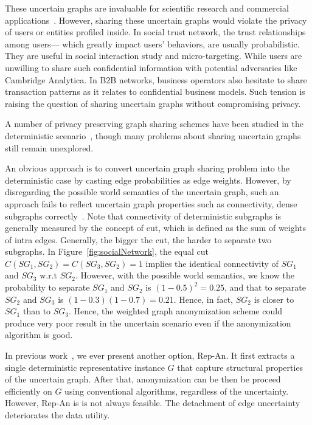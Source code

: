 These uncertain graphs are invaluable for scientific research and commercial applications~\cite{Kempe_Maximizing_2003,Cho_Friendship_2011}. However, sharing these uncertain graphs would violate the privacy of users or entities profiled inside. In social trust network, the trust relationships among users--- which greatly impact users' behaviors, are usually probabilistic.  They are useful in social interaction study and micro-targeting. While users are unwilling to share such confidential information with potential adversaries like Cambridge Analytica. In B2B networks, business operators also hesitate to share transaction patterns as it relates to  confidential business models. Such tension is raising the question of sharing uncertain graphs without compromising privacy. 


A number of privacy preserving graph sharing schemes have been studied in the deterministic scenario~\cite{Liu_Towards_2008,Ying_Randomizing_2008,Wang2011,Liu_Privacy_2009,Nguyen_Anonymizing_2015,Sala_Sharing_2011,Xiao_Differentially_2014,lee2011}, though many problems about sharing uncertain graphs still remain unexplored.

An obvious approach is to convert uncertain graph sharing problem into the deterministic case by casting edge probabilities as edge weights. However, by disregarding the possible world semantics of the uncertain graph, such an approach fails to reflect uncertain graph properties such as connectivity, dense subgraphs correctly~\cite{Zhao_Detecting_2014,Hua_Probabilistic_2010}. {\small Note that connectivity of deterministic subgraphs is generally measured by the concept of cut, which is defined as the sum of weights of intra edges. Generally, the bigger the cut, the harder to separate two subgraphs. In Figure~\ref{fig:socialNetwork}, the equal cut $C(SG_{1},SG_{2})=C(SG_{3},SG_{2})=1$ implies the identical connectivity of $SG_{1}$ and $SG_{3}$ w.r.t $SG_{2}$. However, with the possible world semantics, we know the probability to separate $SG_{1}$ and $SG_{2}$ is $(1-0.5)^{2}=0.25$, and that to separate $SG_{2}$ and $SG_{3}$ is $(1-0.3)(1-0.7)=0.21$. Hence, in fact, $SG_{2}$ is closer to $SG_{1}$ than to $SG_{3}$.} 
Hence, the weighted graph anonymization scheme could produce very poor result in the uncertain scenario even if the anonymization algorithm is good. 


In previous work~\cite{Xiao:2018}, we ever present another option, Rep-An. 
It first extracts a single deterministic representative
instance $G$ that capture structural properties of the uncertain
graph.
After that, anonymization can be then be proceed efficiently on $G$ using conventional algorithms, regardless of the uncertainty.  
However, Rep-An is is not always feasible. The detachment of edge uncertainty deteriorates the data utility. 


